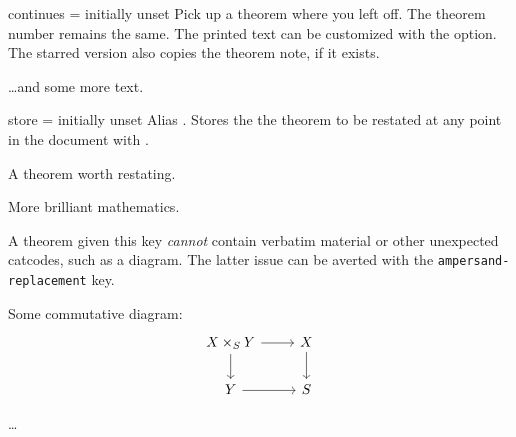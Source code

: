 \documentclass{ltxdoc}
\begin{document}
\begin{docKey}{continues}
  {\sarg=}
  {initially unset}
Pick up a theorem where you left off.
The theorem number remains the same.
The printed text can be customized with the  option.
The starred version also copies the theorem note, if it exists.

\begin{keythmscode}[]
\begin{theorem}[continues=foo]
\dots and some more text.
\end{theorem}
\end{keythmscode}

\end{docKey}

\begin{docKey}{store}
  {=}
  {initially unset}
Alias .
Stores the the theorem to be restated at any point in the document with .

\begin{keythmscode}[]
\begin{theorem}[store=blub]
A theorem worth restating.
\end{theorem}
More brilliant mathematics.
\end{keythmscode}

A theorem given this key \emph{cannot} contain verbatim material or other unexpected catcodes, such as a  diagram.
The latter issue can be averted with the \texttt{ampersand-replacement} key.

\begin{tcbwritetemp}
\usepackage{tikz}
\usetikzlibrary{cd}
\end{tcbwritetemp}

\begin{keythmscode}[withpreamble]
\begin{lemma}[store=diagram]
Some commutative diagram:
\[\begin{tikzcd}[ampersand replacement=\&]
X\times_S Y \ar[r] \ar[d] \& X \ar[d] \\
Y \ar[r] \& S
\end{tikzcd}\]
\end{lemma}
\dots
{}
\end{keythmscode}

\end{docKey}
\end{document}

